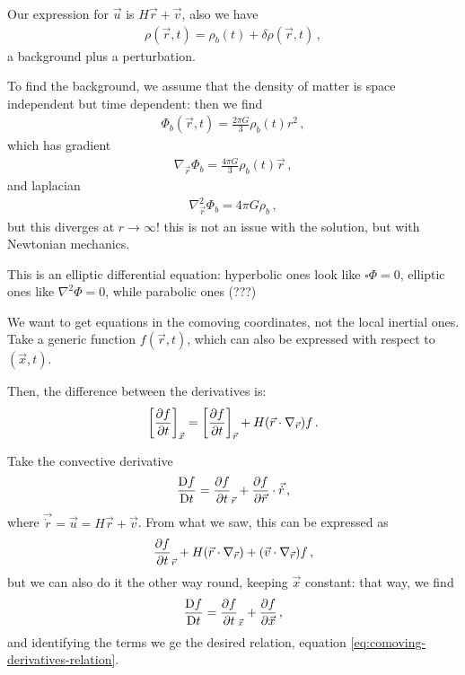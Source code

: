 \documentclass[main.tex]{subfiles}
\begin{document}
Our expression for \(\vec{u}\) is \(H \vec{r} + \vec{v}\), also we have 
%
\begin{align}
  \rho (\vec{r}, t) = \rho_{b} (t) + \delta \rho (\vec{r}, t)
\,,
\end{align}
%
a background plus a perturbation. 

To find the background, we assume that the density of matter is space independent but time dependent: then we find 
%
\begin{align}
  \Phi_{b } (\vec{r}, t) = \frac{2 \pi G}{3} \rho_{b} (t) r^2
\,,
\end{align}
%
which has gradient 
%
\begin{align}
  \nabla_{\vec{r}} \Phi_{b} = \frac{4 \pi G}{3} \rho_b (t) \vec{r} 
\,,
\end{align}
%
and laplacian 
%
\begin{align}
  \nabla^2_{\vec{r}} \Phi_{b} = 4 \pi G \rho_b
\,,
\end{align}
%
but this diverges at \(r \rightarrow \infty\)! this is not an issue with the solution, but with Newtonian mechanics. 

This is an elliptic differential equation: hyperbolic ones look like \( \square \Phi = 0\), elliptic ones like \(\nabla^2 \Phi =0  \), while parabolic ones (???)

We want to get equations in the comoving coordinates, not the local inertial ones. Take a generic function \(f(\vec{r}, t)\), which can also be expressed with respect to \((\vec{x}, t)\). 

Then, the difference between the derivatives is: 
%
\begin{align} \label{eq:comoving-derivatives-relation}
  \qty[\pdv{f}{t}]_{\vec{x}} =   \qty[\pdv{f}{t}]_{\vec{r}} + H \qty(\vec{r} \cdot \nabla_{\vec{r}}) f
\,.
\end{align}

Take the convective derivative 
%
\begin{align}
  \frac{\mathrm{D} f}{\mathrm{D}t } 
  = \pdv{f}{t}_{\vec{r}} + \pdv{f}{\vec{r}} \cdot \vec{\dot{r}} 
\,,
\end{align}
%
where \(\vec{\dot{r}
} = \vec{u} = H \vec{r} + \vec{v} \). 
From what we saw, this can be expressed as 
%
\begin{align}
  \pdv{f}{t}_{\vec{r}} + H \qty(\vec{r} \cdot \nabla_{\vec{r}}  ) + \qty(\vec{v} \cdot \nabla_{\vec{r}}) f 
\,,
\end{align}
%
but we can also do it the other way round, keeping \(\vec{x}\) constant: that way, we find 
%
\begin{align}
  \frac{\mathrm{D} f}{\mathrm{D}t } 
  = \pdv{f}{t}_{\vec{x}} + \pdv{f}{\vec{x}}
\,,
\end{align}
%
and identifying the terms we ge the desired relation, equation \eqref{eq:comoving-derivatives-relation}. 
\end{document}
